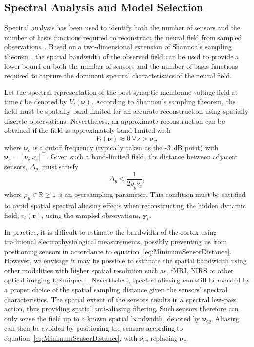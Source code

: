 \documentclass[10pt]{article}
\begin{document}
\subsection{Spectral Analysis and Model Selection}\label{SpectralAnalysisSection} Spectral analysis has been used to identify both the number of sensors and the number of basis functions required to reconstruct the neural field from sampled observations~\cite{Sanner1992,Scerri2009}. Based on a two-dimensional extension of Shannon's sampling theorem \cite{Peterson1962}, the spatial bandwidth of the observed field can be used to provide a lower bound on both the number of sensors and the number of basis functions required to capture the dominant spectral characteristics of the neural field.

Let the spectral representation of the post-synaptic membrane voltage field at time $t$ be denoted by $V_t(\boldsymbol{\nu})$. According to Shannon's sampling theorem, the field must be spatially band-limited for an accurate reconstruction using spatially discrete observations. Nevertheless, an approximate reconstruction can be obtained if the field is approximately band-limited with 
\begin{equation}
	V_t(\boldsymbol{\nu}) \approx 0 ~ \forall \boldsymbol{\nu} > \boldsymbol{\nu}_c,
\end{equation}
where $\boldsymbol{\nu}_c$ is a cutoff frequency (typically taken as the -3~dB point) with $\boldsymbol{\nu}_c = [\nu_c ~ \nu_c]^\top$. Given such a band-limited field, the distance between adjacent sensors, $\Delta_y$, must satisfy 
\begin{equation}
	\label{eq:MinimumSensorDistance} \Delta_y \leq \frac{1}{2\rho_y\nu_{c}}, 
\end{equation}
where $\rho_y \in \mathbb{R} \ge 1$ is an oversampling parameter. This condition must be satisfied to avoid spatial spectral aliasing effects when reconstructing the hidden dynamic field, $v_t(\mathbf{r})$, using the sampled observations, $\mathbf{y}_t$.

In practice, it is difficult to estimate the bandwidth of the cortex using traditional electrophysiological measurements, possibly preventing us from positioning sensors in accordance to equation~\ref{eq:MinimumSensorDistance}. However, we envisage it may be possible to estimate the spatial bandwidth using other modalities with higher spatial resolution such as, fMRI, NIRS or other optical imaging techniques~\cite{Issa2000}. Nevertheless, spectral aliasing can still be avoided by a proper choice of the spatial sampling distance given the sensors' spectral characteristics. The spatial extent of the sensors results in a spectral low-pass action, thus providing spatial anti-aliasing filtering. Such sensors therefore can only sense the field up to a known spatial bandwidth, denoted by $\boldsymbol{\nu}_{cy}$. Aliasing can then be avoided by positioning the sensors according to equation~\ref{eq:MinimumSensorDistance}, with $\boldsymbol{\nu}_{cy}$ replacing $\boldsymbol{\nu}_c$. 
\end{document}
